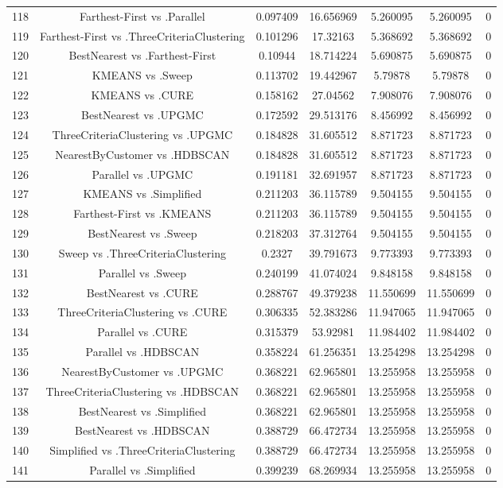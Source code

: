 \documentclass[a4paper,10pt]{article}
\begin{document}
\begin{landscape}
\begin{table}[!htp]
\begin{tabular}{ccccccc}
118&Farthest-First vs .Parallel&0.097409&16.656969&5.260095&5.260095&0\\
119&Farthest-First vs .ThreeCriteriaClustering&0.101296&17.32163&5.368692&5.368692&0\\
120&BestNearest vs .Farthest-First&0.10944&18.714224&5.690875&5.690875&0\\
121&KMEANS vs .Sweep&0.113702&19.442967&5.79878&5.79878&0\\
122&KMEANS vs .CURE&0.158162&27.04562&7.908076&7.908076&0\\
123&BestNearest vs .UPGMC&0.172592&29.513176&8.456992&8.456992&0\\
124&ThreeCriteriaClustering vs .UPGMC&0.184828&31.605512&8.871723&8.871723&0\\
125&NearestByCustomer vs .HDBSCAN&0.184828&31.605512&8.871723&8.871723&0\\
126&Parallel vs .UPGMC&0.191181&32.691957&8.871723&8.871723&0\\
127&KMEANS vs .Simplified&0.211203&36.115789&9.504155&9.504155&0\\
128&Farthest-First vs .KMEANS&0.211203&36.115789&9.504155&9.504155&0\\
129&BestNearest vs .Sweep&0.218203&37.312764&9.504155&9.504155&0\\
130&Sweep vs .ThreeCriteriaClustering&0.2327&39.791673&9.773393&9.773393&0\\
131&Parallel vs .Sweep&0.240199&41.074024&9.848158&9.848158&0\\
132&BestNearest vs .CURE&0.288767&49.379238&11.550699&11.550699&0\\
133&ThreeCriteriaClustering vs .CURE&0.306335&52.383286&11.947065&11.947065&0\\
134&Parallel vs .CURE&0.315379&53.92981&11.984402&11.984402&0\\
135&Parallel vs .HDBSCAN&0.358224&61.256351&13.254298&13.254298&0\\
136&NearestByCustomer vs .UPGMC&0.368221&62.965801&13.255958&13.255958&0\\
137&ThreeCriteriaClustering vs .HDBSCAN&0.368221&62.965801&13.255958&13.255958&0\\
138&BestNearest vs .Simplified&0.368221&62.965801&13.255958&13.255958&0\\
139&BestNearest vs .HDBSCAN&0.388729&66.472734&13.255958&13.255958&0\\
140&Simplified vs .ThreeCriteriaClustering&0.388729&66.472734&13.255958&13.255958&0\\
141&Parallel vs .Simplified&0.399239&68.269934&13.255958&13.255958&0\\

\end{tabular}
\end{table}
\end{landscape}
\end{document}
